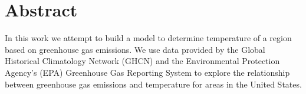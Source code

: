 \section{Abstract}
In this work we attempt to build a model to determine temperature of a region based on greenhouse gas emissions. We use data provided by the Global Historical Climatology Network (GHCN) and the Environmental Protection Agency's (EPA) Greenhouse Gas Reporting System to explore the relationship between greenhouse gas emissions and temperature for areas in the United States. 